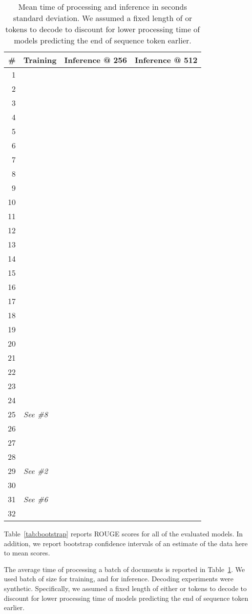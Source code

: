 \documentclass{article}
\begin{document}
\begin{table}
    \caption{Mean time of processing and inference in seconds  standard deviation. We assumed a fixed length of  or  tokens to decode to discount for lower processing time of models predicting the end of sequence token earlier.}
    \label{tab:timeci}
    \small
    \centering
\begin{tabular}{rrrr}
    \toprule
    \# & Training & Inference @ 256 & Inference @ 512 \\
    \midrule
    1 &   &   &   \\ 2 &   &   &   \\ 3 &   &   &  \\ 4 &   &   &  \\ 5 &   &   &  \\ 6 &   &   &  \\ 7 &   &   &  \\ 8 &   &   &  \\ 9 &   &   &  \\
    10 &   &   &  \\
    11 &   &   &  \\
    12 &   &   &  \\
    13 &   &   &  \\
    14 &   &   &  \\
    15 &   &   &  \\
    16 &   &   &  \\
    17 &   &   &  \\
    18 &   &   &  \\
    19 &   &   &  \\
    20 &   &   &  \\
    21 &   &   &  \\
    22 &   &   &    \\ 23 &   &   &    \\ 24 &   &   &    \\ 25 & \multicolumn{3}{l}{\textit{ See \#8}} \\
    26 &   &   &    \\ 

    27 &   &   &  \\ 28 &   &   &  \\ 29 & \multicolumn{3}{l}{\textit{ See \#2}} \\
    30 &   &   &  \\ 31 & \multicolumn{3}{l}{\textit{ See  \#6}} \\
    32 &   &   &  \\ 

    \bottomrule
    \end{tabular}
\end{table}


Table~\ref{tab:bootstrap} reports ROUGE scores for all of the evaluated models. In addition, we report  bootstrap confidence intervals of an estimate of the data here to mean scores.

The average time of processing a batch of documents is reported in Table~\ref{tab:timeci}. We used batch of size  for training, and  for inference. Decoding experiments were synthetic. Specifically, we assumed a fixed length of either  or  tokens to decode to discount for lower processing time of models predicting the end of sequence token earlier.
\end{document}
